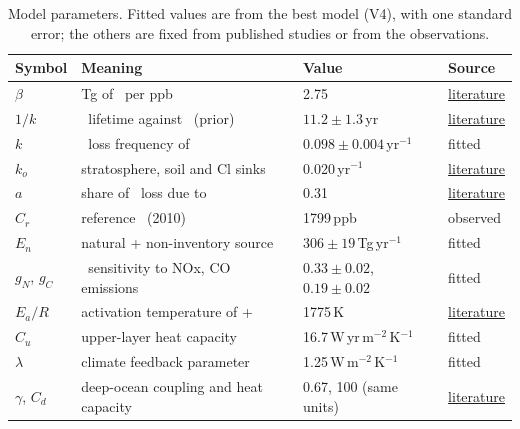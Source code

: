 \documentclass[11pt,a4paper]{article}
\newcommand{\CH}{\ce{CH4}}
\newcommand{\OH}{\ce{OH}}
\begin{document}
\begin{table}[t]
\centering\small
\caption{Model parameters. Fitted values are from the best model (V4), with one standard error; the others are fixed from published studies or from the observations.}
\label{tab:params}
\begin{tabular}{llll}
\toprule
Symbol & Meaning & Value & Source\\
\midrule
$\beta$ & Tg of \CH\ per ppb & 2.75 & \href{https://doi.org/10.5194/essd-17-1873-2025}{literature}\\
$1/k$ & \CH\ lifetime against \OH\ (prior) & $11.2\pm1.3$\,yr & \href{https://doi.org/10.1029/2012GL051440}{literature}\\
$k$ & \OH\ loss frequency of \CH & $0.098\pm0.004$\,yr$^{-1}$ & fitted\\
$k_o$ & stratosphere, soil and Cl sinks & 0.020\,yr$^{-1}$ & \href{https://doi.org/10.1029/2012GL051440}{literature}\\
$a$ & share of \OH\ loss due to \CH & 0.31 & \href{https://doi.org/10.5194/acp-13-285-2013}{literature}\\
$C_r$ & reference \CH\ (2010) & 1799\,ppb & observed\\
$E_n$ & natural + non-inventory source & $306\pm19$\,Tg\,yr$^{-1}$ & fitted\\
$g_N$, $g_C$ & \OH\ sensitivity to NOx, CO emissions & $0.33\pm0.02$, $0.19\pm0.02$ & fitted\\
$E_a/R$ & activation temperature of \CH+\OH & 1775\,K & \href{https://ntrs.nasa.gov/citations/20210006316}{literature}\\
$C_u$ & upper-layer heat capacity & 16.7\,W\,yr\,m$^{-2}$\,K$^{-1}$ & fitted\\
$\lambda$ & climate feedback parameter & 1.25\,W\,m$^{-2}$\,K$^{-1}$ & fitted\\
$\gamma$, $C_d$ & deep-ocean coupling and heat capacity & 0.67, 100 (same units) & \href{https://doi.org/10.1175/JCLI-D-12-00195.1}{literature}\\
\bottomrule
\end{tabular}
\end{table}
\end{document}
